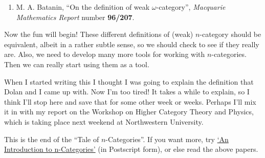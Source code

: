 \documentclass{article}
\def\tightlist{}
\begin{document}
\begin{enumerate}
\def\labelenumi{\arabic{enumi})}
\setcounter{enumi}{8}
\tightlist
\item
  M. A. Batanin, ``On the definition of weak \(\omega\)-category'',
  \emph{Macquarie Mathematics Report} number \textbf{96/207}.
\end{enumerate}

Now the fun will begin! These different definitions of (weak)
\(n\)-category should be equivalent, albeit in a rather subtle sense, so
we should check to see if they really are. Also, we need to develop many
more tools for working with \(n\)-categories. Then we can really start
using them as a tool.

When I started writing this I thought I was going to explain the
definition that Dolan and I came up with. Now I'm too tired! It takes a
while to explain, so I think I'll stop here and save that for some other
week or weeks. Perhaps I'll mix it in with my report on the Workshop on
Higher Category Theory and Physics, which is taking place next weekend
at Northwestern University.

This is the end of the ``Tale of \(n\)-Categories''. If you want more,
try \href{http://math.ucr.edu/home/baez/ncat.ps}{`An Introduction to
n-Categories'} (in Postscript form), or else read the above papers.
\end{document}
